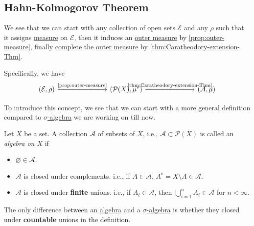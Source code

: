 \subsection{Hahn-Kolmogorov Theorem}
We see that we can start with any collection of open sets \(\mathcal{E}\) and any \(\rho\) such that it assigns \hyperref[def:measure]{measure} on \(\mathcal{E}\), then it induces an
\hyperref[def:outer-measure]{outer measure} by \autoref{prop:outer-measure}, finally \hyperref[def:complete-measure-space]{complete} the \hyperref[def:outer-measure]{outer measure} by \autoref{thm:Caratheodory-extension-Thm}.

Specifically, we have
\[
	\begin{tikzcd}
		(\mathcal{E}, \rho) \ar[rrr, "\text{\autoref{prop:outer-measure}}"] &&& (\mathcal{P}(X), \mu^{*} ) \ar[rrr, "\text{\autoref{thm:Caratheodory-extension-Thm}}"] &&& (\mathcal{A} , \mu)
	\end{tikzcd}
\]

\par To introduce this concept, we see that we can start with a more general definition compared to \hyperref[def:sigma-algebra]{\(\sigma\)-algebra} we are working on till now.
\begin{definition}[Algebra]\label{def:algebra}
	Let \(X\) be a set. A collection \(\mathcal{A} \) of subsets of \(X\), i.e., \(\mathcal{A}\subset \mathcal{P} (X) \) is called an \emph{algebra on \(X\)} if
	\begin{itemize}
		\item \(\varnothing \in \mathcal{A} \).
		\item \(\mathcal{A} \) is closed under complements. i.e., if \(A\in \mathcal{A} \), \(A^c = X\setminus A\in \mathcal{A} \).
		\item \(\mathcal{A} \) is closed under \textbf{finite} unions. i.e., if \(A_i\in \mathcal{A} \), then \(\bigcup\limits_{i=1}^{n} A_{i}\in \mathcal{A} \) for \(n<\infty \).
	\end{itemize}
\end{definition}
\begin{remark}
	The only difference between an \hyperref[def:algebra]{algebra} and a \hyperref[def:sigma-algebra]{\(\sigma\)-algebra} is whether they closed under \textbf{countable} unions in the definition.
\end{remark}

